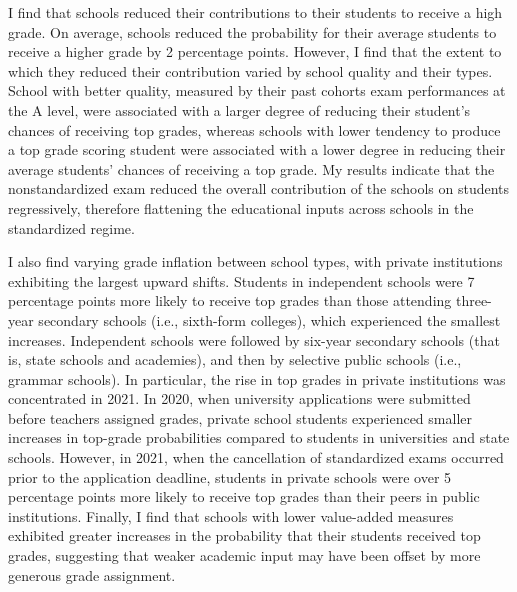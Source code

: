 I find that schools reduced their contributions to their students to receive a high grade. On average, schools reduced the probability for their average students to receive a higher grade by 2 percentage points. However, I find that the extent to which they reduced their contribution varied by school quality and their types. School with better quality, measured by their past cohorts exam performances at the A level, were associated with a larger degree of reducing their student's chances of receiving top grades, whereas schools with lower tendency to produce a top grade scoring student were associated with a lower degree in reducing their average students' chances of receiving a top grade. My results indicate that the nonstandardized exam reduced the overall contribution of the schools on students regressively, therefore flattening the educational inputs across schools in the standardized regime.

I also find varying grade inflation between school types, with private institutions exhibiting the largest upward shifts. Students in independent schools were 7 percentage points more likely to receive top grades than those attending three-year secondary schools (i.e., sixth-form colleges), which experienced the smallest increases. Independent schools were followed by six-year secondary schools (that is, state schools and academies), and then by selective public schools (i.e., grammar schools). In particular, the rise in top grades in private institutions was concentrated in 2021. In 2020, when university applications were submitted before teachers assigned grades, private school students experienced smaller increases in top-grade probabilities compared to students in universities and state schools. However, in 2021, when the cancellation of standardized exams occurred prior to the application deadline, students in private schools were over 5 percentage points more likely to receive top grades than their peers in public institutions. Finally, I find that schools with lower value-added measures exhibited greater increases in the probability that their students received top grades, suggesting that weaker academic input may have been offset by more generous grade assignment.

